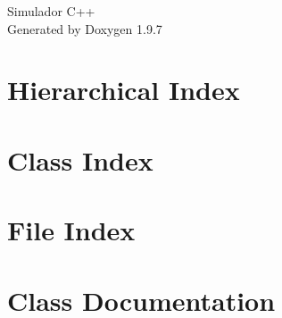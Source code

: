 \documentclass[twoside]{book}
\newcommand{\+}{\discretionary{\mbox{\scriptsize$\hookleftarrow$}}{}{}}
\newcommand{\clearemptydoublepage}{%
    \newpage{\pagestyle{empty}\cleardoublepage}%
  }
\begin{document}
  \raggedbottom
    \hypersetup{pageanchor=false,
                bookmarksnumbered=true,
                pdfencoding=unicode
               }
  \begin{titlepage}
  \vspace*{7cm}
  \begin{center}%
  {\Large Simulador C++}\\
  \vspace*{1cm}
  {\large Generated by Doxygen 1.9.7}\\
  \end{center}
  \end{titlepage}
  \clearemptydoublepage
  \tableofcontents
  \clearemptydoublepage
  \hypersetup{pageanchor=true}

\chapter{Hierarchical Index}

\chapter{Class Index}

\chapter{File Index}

\chapter{Class Documentation}










\end{document}
